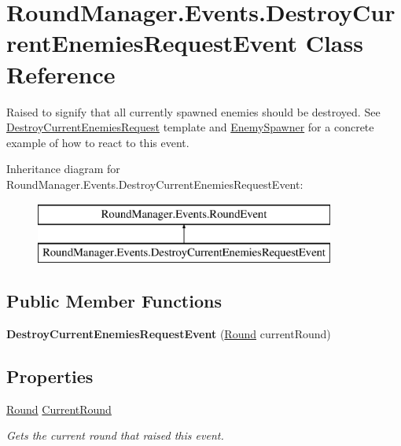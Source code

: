 \hypertarget{class_round_manager_1_1_events_1_1_destroy_current_enemies_request_event}{}\section{Round\+Manager.\+Events.\+Destroy\+Current\+Enemies\+Request\+Event Class Reference}
\label{class_round_manager_1_1_events_1_1_destroy_current_enemies_request_event}


Raised to signify that all currently spawned enemies should be destroyed. See \hyperlink{class_round_manager_1_1_destroy_current_enemies_request}{Destroy\+Current\+Enemies\+Request} template and \hyperlink{class_round_manager_1_1_enemy_spawner}{Enemy\+Spawner} for a concrete example of how to react to this event.  


Inheritance diagram for Round\+Manager.\+Events.\+Destroy\+Current\+Enemies\+Request\+Event\+:\begin{figure}[H]
\begin{center}
\leavevmode
\includegraphics[height=2.000000cm]{class_round_manager_1_1_events_1_1_destroy_current_enemies_request_event}
\end{center}
\end{figure}
\subsection*{Public Member Functions}
\begin{DoxyCompactItemize}
\item 
\hypertarget{class_round_manager_1_1_events_1_1_destroy_current_enemies_request_event_a82b536d8881e330f2ef9a2ca92c00063}{}{\bfseries Destroy\+Current\+Enemies\+Request\+Event} (\hyperlink{class_round_manager_1_1_round}{Round} current\+Round)\label{class_round_manager_1_1_events_1_1_destroy_current_enemies_request_event_a82b536d8881e330f2ef9a2ca92c00063}

\end{DoxyCompactItemize}
\subsection*{Properties}
\begin{DoxyCompactItemize}
\item 
\hyperlink{class_round_manager_1_1_round}{Round} \hyperlink{class_round_manager_1_1_events_1_1_destroy_current_enemies_request_event_a0ecf1401856fc8cf0ed4763d08816149}{Current\+Round}
\begin{DoxyCompactList}\small\item\em Gets the current round that raised this event. \end{DoxyCompactList}\end{DoxyCompactItemize}


